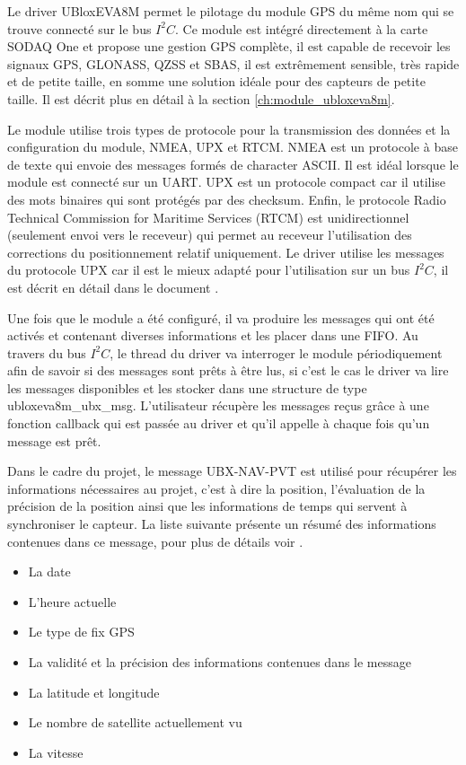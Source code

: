 Le driver UBloxEVA8M permet le pilotage du module GPS du même nom qui se trouve connecté sur le bus $I^{2}C$. Ce module est intégré directement à la carte SODAQ One et propose une gestion GPS complète, il est capable de recevoir les signaux GPS, GLONASS, QZSS et SBAS, il est extrêmement sensible, très rapide et de petite taille, en somme une solution idéale pour des capteurs de petite taille. Il est décrit plus en détail à la section \ref{ch:module_ubloxeva8m}. 

Le module utilise trois types de protocole pour la transmission des données et la configuration du module, NMEA, UPX et RTCM. NMEA est un protocole à base de texte qui envoie des messages formés de character ASCII. Il est idéal lorsque le module est connecté sur un UART. UPX est un protocole compact car il utilise des mots binaires qui sont protégés par des checksum. Enfin, le protocole Radio Technical Commission for Maritime Services (RTCM) est unidirectionnel (seulement envoi vers le receveur) qui permet au receveur l'utilisation des corrections du positionnement relatif uniquement.
Le driver utilise les messages du protocole UPX car il est le mieux adapté pour l'utilisation sur un bus $I^{2}C$, il est décrit en détail dans le document \cite{ublox-protocol}.

Une fois que le module a été configuré, il va produire les messages qui ont été activés et contenant diverses informations et les placer dans une FIFO. Au travers du bus $I^{2}C$, le thread du driver va interroger le module périodiquement afin de savoir si des messages sont prêts à être lus, si c'est le cas le driver va lire les messages disponibles et les stocker dans une structure de type ubloxeva8m\_ubx\_msg. L'utilisateur récupère les messages reçus grâce à une fonction callback qui est passée au driver et qu'il appelle à chaque fois qu'un message est prêt.

Dans le cadre du projet, le message UBX-NAV-PVT est utilisé pour récupérer les informations nécessaires au projet, c'est à dire la position, l'évaluation de la précision de la position ainsi que les informations de temps qui servent à synchroniser le capteur. La liste suivante présente un résumé des informations contenues dans ce message, pour plus de détails voir \cite[p.~307]{ublox-protocol}.

\begin{itemize}
 \item La date
 \item L'heure actuelle 
 \item Le type de fix GPS
 \item La validité et la précision des informations contenues dans le message
 \item La latitude et longitude
 \item Le nombre de satellite actuellement vu
 \item La vitesse
 \end{itemize} 

